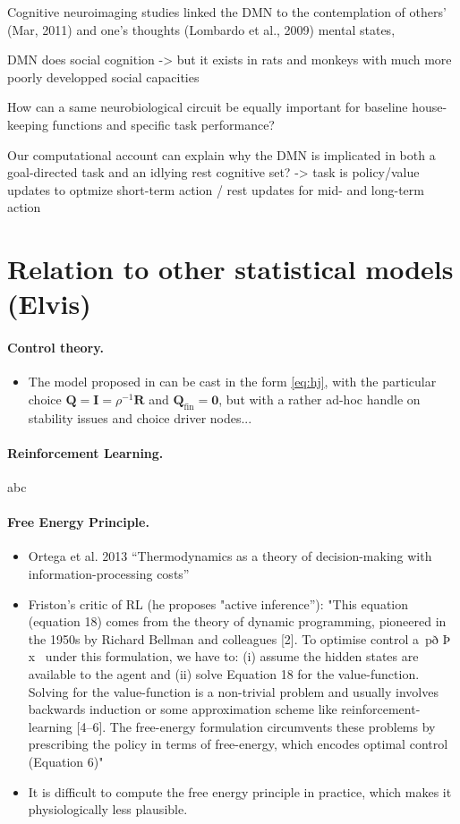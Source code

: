 \documentclass{article} %
\newcommand{\R}{\mathbb{R}}
\def\R{\mathbf{R}}
\def\Q{\mathbf{Q}}
\begin{document}
Cognitive neuroimaging studies linked the DMN to the contemplation of others’ (Mar, 2011) and one’s thoughts (Lombardo et al., 2009) mental states, 

DMN does social cognition -> but it exists in rats and monkeys with much more poorly developped social capacities

How can a same neurobiological circuit be equally important for baseline house-keeping functions and specific task performance?

Our computational account can explain why the DMN is implicated in both a goal-directed task and an idlying rest cognitive set? -> task is policy/value updates to optmize short-term action / rest updates for mid- and long-term action


\section{Relation to other statistical models (Elvis)}
\paragraph{Control theory.}
\begin{itemize}
  \item The model proposed in \cite{betzel2016} can be cast in the form \eqref{eq:hj}, with the particular choice $\Q = \textbf{I} = \rho^{-1}\R$ and $\Q_{\text{fin}} = \textbf{0}$, but with a rather ad-hoc handle on stability issues and choice driver nodes...
\end{itemize}

\paragraph{Reinforcement Learning.}
abc

\paragraph{Free Energy Principle.}
\begin{itemize}
  \item Ortega et al. 2013 \cite{ortega2013thermodynamics} ``Thermodynamics as a theory of decision-making with information-processing costs''
\item Friston's critic of RL \cite{fristonAIorRL} (he proposes "active inference''): "This equation (equation 18) comes from the theory of dynamic programming,
pioneered in the 1950s by Richard Bellman and colleagues [2]. To
optimise control a~pð Þ x~ under this formulation, we have to: (i)
assume the hidden states are available to the agent and (ii) solve
Equation 18 for the value-function. Solving for the value-function
is a non-trivial problem and usually involves backwards induction
or some approximation scheme like reinforcement-learning [4–6].
The free-energy formulation circumvents these problems by
prescribing the policy in terms of free-energy, which encodes
optimal control (Equation 6)"
\item It is difficult to compute the free energy principle
in practice, which makes it physiologically less plausible.
  \end{itemize}
\end{document}

